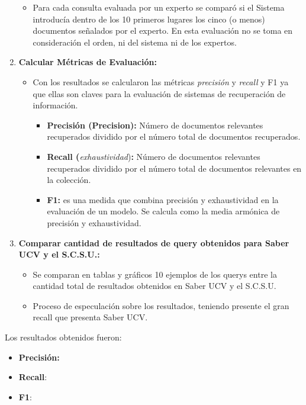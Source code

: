 \documentclass[
  12pt,
  openany]{book}
\providecommand{\tightlist}{%
  \setlength{\itemsep}{0pt}\setlength{\parskip}{0pt}}
\begin{document}
\begin{enumerate}
  \begin{itemize}
  \tightlist
  \item
    Para cada consulta evaluada por un experto se comparó si el Sistema introducía dentro de los 10 primeros lugares los cinco (o menos) documentos señalados por el experto. En esta evaluación no se toma en consideración el orden, ni del sistema ni de los expertos.
  \end{itemize}
\item
  \textbf{Calcular Métricas de Evaluación:}

  \begin{itemize}
  \tightlist
  \item
    Con los resultados se calcularon las métricas \emph{precisión} y \emph{recall} y F1 ya que ellas son claves para la evaluación de sistemas de recuperación de información.

    \begin{itemize}
    \tightlist
    \item
      \textbf{Precisión (Precision):} Número de documentos relevantes recuperados dividido por el número total de documentos recuperados.
    \item
      \textbf{Recall (}\emph{exhaustividad})\textbf{:} Número de documentos relevantes recuperados dividido por el número total de documentos relevantes en la colección.
    \item
      \textbf{F1:} es una medida que combina precisión y exhaustividad en la evaluación de un modelo. Se calcula como la media armónica de precisión y exhaustividad.
    \end{itemize}
  \end{itemize}
\item
  \textbf{Comparar cantidad de resultados de query obtenidos para Saber UCV y el S.C.S.U.:}

  \begin{itemize}
  \tightlist
  \item
    Se comparan en tablas y gráficos 10 ejemplos de los querys entre la cantidad total de resultados obtenidos en Saber UCV y el S.C.S.U.
  \item
    Proceso de especulación sobre los resultados, teniendo presente el gran recall que presenta Saber UCV.
  \end{itemize}
\end{enumerate}

Los resultados obtenidos fueron:

\begin{itemize}
\item
  \textbf{Precisión:}
\item
  \textbf{Recall}:
\item
  \textbf{F1}:
\end{itemize}
\end{document}
